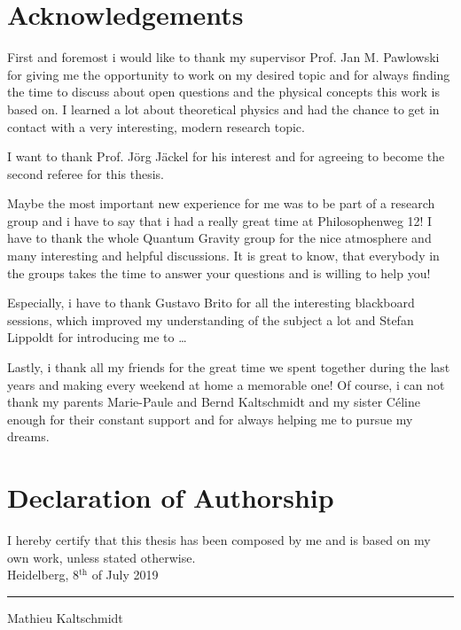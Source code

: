 \thispagestyle{plain}
\section*{Acknowledgements}
First and foremost i would like to thank my supervisor Prof. Jan M. Pawlowski for giving me the opportunity to work on my desired topic and for always finding the time to discuss about open questions and the physical concepts this work is based on. I learned a lot about theoretical physics and had the chance to get in contact with a very interesting, modern research topic. 

I want to thank Prof. J\"org J\"ackel for his interest and for agreeing to become the second referee for this thesis.

Maybe the most important new experience for me was to be part of a research group and i have to say that i had a really great time at Philosophenweg 12! I have to thank the whole Quantum Gravity group for the nice atmosphere and many interesting and helpful discussions. It is great to know, that everybody in the groups takes the time to answer your questions and is willing to help you!

  Especially, i have to thank Gustavo Brito for all the interesting blackboard sessions, which improved  my understanding of the subject a lot and Stefan Lippoldt for introducing me  to \dots



Lastly, i thank all my friends for the great time we spent together during the last years and making every weekend at home a memorable one! Of course, i can not thank my parents Marie-Paule and Bernd Kaltschmidt and my sister C\'{e}line enough for their constant support and for always helping me to pursue my dreams.  
 

\section*{Declaration of Authorship}
I hereby certify that this thesis has been composed by me and is based on my own work, unless stated otherwise.\\

Heidelberg, 8$^{\mathrm{th}}$ of July 2019 \hfill \rule{60mm}{.15mm} \par \vspace{-0.4cm}
\hfill Mathieu Kaltschmidt


